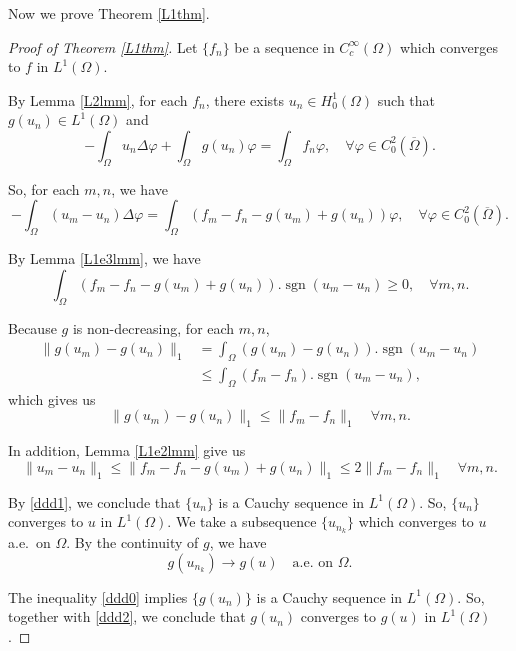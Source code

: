 \documentclass[a4paper, 11pt]{report}
\theoremstyle{definition}\newtheorem*{rmk}{Remark}
\DeclareMathOperator{\sgn}{sgn}
\begin{document}
Now we prove Theorem \ref{L1thm}.

\begin{proof}[Proof of Theorem \ref{L1thm}]
\mbox{}

Let $\{f_n\}$ be a sequence in $C^{\infty}_c(\Omega)$ which converges to $f$ in $L^1(\Omega)$.

By Lemma \ref{L2lmm}, for each $f_n$, there exists $u_n\in H^1_0(\Omega)$ such that $g(u_n)\in L^1(\Omega)$ and
\begin{equation}\label{ddd4}
-\int_{\Omega} u_n\Delta \varphi +\int_{\Omega} g(u_n)\varphi = \int_{\Omega} f_n \varphi, \quad\forall \varphi\in C^2_0(\overline{\Omega}).
\end{equation}

So, for each $m,n$, we have
\[
-\int_{\Omega} (u_m-u_n)\Delta \varphi = \int_{\Omega} (f_m-f_n-g(u_m)+g(u_n)) \varphi, \quad\forall \varphi\in C^2_0(\overline{\Omega}).
\]

By Lemma \ref{L1e3lmm}, we have
\[
\int_{\Omega} (f_m-f_n-g(u_m)+g(u_n)).\sgn(u_m-u_n) \ge 0, \quad \forall m,n.
\]

Because $g$ is non-decreasing, for each $m,n$,
\begin{align*}
\| g(u_m)-g(u_n)\|_1 &= \int_{\Omega} (g(u_m)-g(u_n)).\sgn(u_m-u_n)\\
&\le \int_{\Omega} (f_m-f_n).\sgn(u_m-u_n),
\end{align*}
which gives us
\begin{equation}\label{ddd0}
\| g(u_m)-g(u_n)\|_1\le \| f_m - f_n \|_1 \quad \forall m,n.
\end{equation}

In addition, Lemma \ref{L1e2lmm} give us
\begin{equation}\label{ddd1}
\| u_m - u_n\|_1 \le \| f_m-f_n-g(u_m)+g(u_n) \|_1 \le 2\| f_m - f_n \|_1\quad \forall m,n.
\end{equation}

By \eqref{ddd1}, we conclude that $\{u_n\}$ is a Cauchy sequence in $L^1(\Omega)$. So, $\{u_n\}$ converges to $u$ in $L^1(\Omega)$. We take a subsequence $\{u_{n_k}\}$ which converges to $u$ a.e.\ on $\Omega$. By the continuity of $g$, we have 
\begin{equation}\label{ddd2}
g(u_{n_k})\to g(u) \quad \text{a.e.\ on }\Omega.
\end{equation}

The inequality \eqref{ddd0} implies $\{g(u_n)\}$ is a Cauchy sequence in $L^1(\Omega)$. So, together with \eqref{ddd2}, we conclude that $g(u_n)$ converges to $g(u)$ in $L^1(\Omega)$.


\end{proof}
\end{document}
